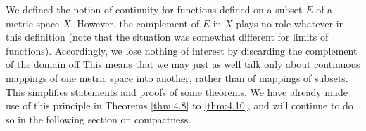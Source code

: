 \begin{myRemark}
    \label{myRemark:4.12}
We defined the notion of continuity for functions defined on a subset $E$ of a metric space $X$. 
However, the complement of $E$ in $X$ plays no role whatever in this definition 
(note that the situation was somewhat different for limits of functions). 
Accordingly, we lose nothing of interest by discarding the complement of the domain off This means that we may just as well talk only about continuous mappings of one metric space into another, rather than
of mappings of subsets. This simplifies statements and proofs of some theorems.
We have already made use of this principle in Theorems \ref{thm:4.8} to \ref{thm:4.10}, and will continue to do so in the following section on compactness.
\end{myRemark}